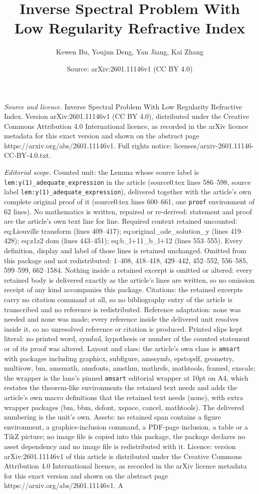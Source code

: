 \documentclass[10pt,a4paper]{amsart}
\title[Inverse Spectral Problem With Low Regularity Refractive Inde]{Inverse Spectral Problem With Low Regularity Refractive Index}
\author{Kewen Bu, Youjun Deng, Yan Jiang, Kai Zhang}
\date{Source: arXiv:2601.11146v1 (CC BY 4.0)}
\begin{document}
\maketitle

\noindent\emph{Source and licence.} Inverse Spectral Problem With Low Regularity Refractive Index. Version arXiv:2601.11146v1 (CC BY 4.0), distributed under the Creative Commons Attribution 4.0 International licence, as recorded in the arXiv licence metadata for this exact version and shown on the abstract page https://arxiv.org/abs/2601.11146v1. Full rights notice: licenses/arxiv-2601.11146-CC-BY-4.0.txt.\par\smallskip

\noindent\textit{Editorial scope.} Counted unit: the Lemma whose source label is \texttt{lem:y(1)\_adequate\_expression} in the article (source0.tex lines 586--598, source label \texttt{lem:y(1)\_adequate\_expression}), delivered together with the article's own complete original proof of it (source0.tex lines 600--661, one \texttt{proof} environment of 62 lines). No mathematics is written, repaired or re-derived: statement and proof are the article's own text line for line. Required context retained uncounted: eq:Liouville transform (lines 409--417); eq:original\_ode\_solution\_y (lines 419--428); eq:z1z2 dom (lines 443--451); eq:b\_l+11\_b\_l+12 (lines 553--555). Every definition, display and label of those lines is retained unchanged. Omitted from this package and not redistributed: 1--408, 418--418, 429--442, 452--552, 556--585, 599--599, 662--1584. Nothing inside a retained excerpt is omitted or altered: every retained body is delivered exactly as the article's lines are written, so no omission receipt of any kind accompanies this package. Citations: the retained excerpts carry no citation command at all, so no bibliography entry of the article is transcribed and no reference is redistributed. Reference adaptation: none was needed and none was made; every reference inside the delivered unit resolves inside it, so no unresolved reference or citation is produced. Printed slips kept literal: no printed word, symbol, hypothesis or number of the counted statement or of its proof was altered. Layout and class: the article's own class is \texttt{amsart} with packages including graphicx, subfigure, amssymb, epstopdf, geometry, multirow, bm, amsmath, amsfonts, amsthm, mathrsfs, mathtools, framed, exscale; the wrapper is the lane's pinned \texttt{amsart} editorial wrapper at 10pt on A4, which restates the theorem-like environments the retained text needs and adds the article's own macro definitions that the retained text needs (none), with extra wrapper packages (bm, bbm, dsfont, xspace, cancel, mathtools). The delivered numbering is the unit's own. Assets: no retained span contains a figure environment, a graphics-inclusion command, a PDF-page inclusion, a table or a TikZ picture; no image file is copied into this package, the package declares no asset dependency and no image file is redistributed with it. Licence: version arXiv:2601.11146v1 of this article is distributed under the Creative Commons Attribution 4.0 International licence, as recorded in the arXiv licence metadata for this exact version and shown on the abstract page https://arxiv.org/abs/2601.11146v1. A 
\end{document}
